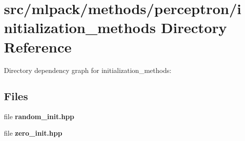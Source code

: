 \section{src/mlpack/methods/perceptron/initialization\-\_\-methods Directory Reference}
\label{dir_8c39302dd7470d3c525c480db4b4f594}
Directory dependency graph for initialization\-\_\-methods\-:
\subsection*{Files}
\begin{DoxyCompactItemize}
\item 
file {\bf random\-\_\-init.\-hpp}
\item 
file {\bf zero\-\_\-init.\-hpp}
\end{DoxyCompactItemize}
